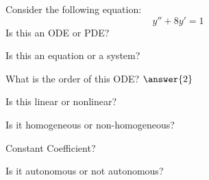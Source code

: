 \documentclass{ximera}
\begin{document}
\begin{exercise}
    Consider the following equation:  
    \[
        y''+8y'=1
    \]
    Is this an ODE or PDE?
    \begin{multipleChoice}
    \end{multipleChoice}
    \begin{problem}
        Is this an equation or a system?
        \begin{multipleChoice}
        \end{multipleChoice}
        
        \begin{problem}
            What is the order of this ODE? $\answer{2}$
            
            \begin{problem}
                Is this linear or nonlinear?
                \begin{multipleChoice}
                \end{multipleChoice}
                
                \begin{problem}
                    Is it homogeneous or non-homogeneous?
                    \begin{multipleChoice}
                    \end{multipleChoice}
                    
                    \begin{problem}
                        Constant Coefficient?
                        \begin{multipleChoice}
                        \end{multipleChoice}
                    \end{problem}
                \end{problem}
            \end{problem}
        \end{problem}
    \end{problem}
    \begin{problem}
        Is it autonomous or not autonomous?
        \begin{multipleChoice}
        \end{multipleChoice}
    \end{problem}
\end{exercise}
\end{document}
